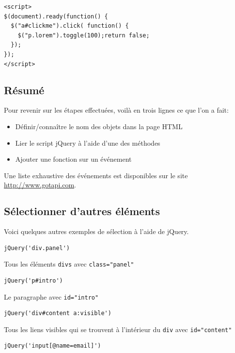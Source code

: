 \documentclass[10pt,a4paper,titlepage]{article}
\begin{document}
\begin{lstlisting}
<script>
$(document).ready(function() {
  $("a#clickme").click( function() {
    $("p.lorem").toggle(100);return false;
  });
});
</script>
\end{lstlisting}

\subsection{Résumé}

Pour revenir sur les étapes effectuées, voilà en trois lignes ce que l'on a fait: \\

\begin{itemize}
	\item Définir/connaître le nom des objets dans la page HTML
	\item Lier le script jQuery à l'aide d'une des méthodes
	\item Ajouter une fonction sur un événement
\end{itemize}

Une liste exhaustive des événements est disponibles sur le site \url{http://www.gotapi.com}.

\subsection{Sélectionner d'autres éléments}

Voici quelques autres exemples de sélection à l'aide de jQuery. 

\begin{lstlisting}
jQuery('div.panel')
\end{lstlisting}

Tous les éléments \texttt{divs} avec \texttt{class="panel"}

\begin{lstlisting}
jQuery('p#intro')
\end{lstlisting}

Le paragraphe avec \texttt{id="intro"}

\begin{lstlisting}
jQuery('div#content a:visible')
\end{lstlisting}

Tous les liens visibles qui se trouvent à l'intérieur du \texttt{div} avec \texttt{id="content"}

\begin{lstlisting}
jQuery('input[@name=email]')
\end{lstlisting}
\end{document}
